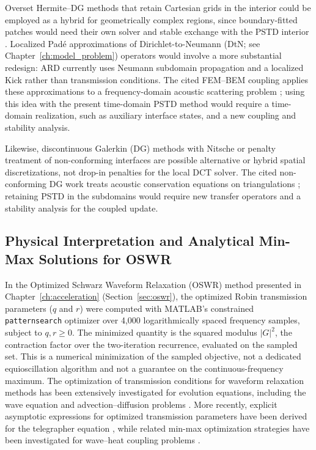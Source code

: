 \documentclass{Configuration_Files/PoliMi3i_thesis}
\newif\ifshowthesischanges
\DeclareRobustCommand{\thesischange}[2]{%
    \ifshowthesischanges
        \textcolor{#1}{#2}%
    \else
        #2%
    \fi
}
\def\thesischange#1#2{#2}%
\begin{document}
\thesischange{red}{Overset Hermite--DG methods that retain Cartesian grids in the interior could be employed as a hybrid for geometrically complex regions, since boundary-fitted patches would need their own solver and stable exchange with the PSTD interior \citep{beznosov_hermite_2021}. Localized Pad\'e approximations of Dirichlet-to-Neumann (DtN; see Chapter~\ref{ch:model_problem}) operators would involve a more substantial redesign: ARD currently uses Neumann subdomain propagation and a localized Kick rather than transmission conditions. The cited FEM--BEM coupling applies these approximations to a frequency-domain acoustic scattering problem \citep{caudron_optimized_2020}; using this idea with the present time-domain PSTD method would require a time-domain realization, such as auxiliary interface states, and a new coupling and stability analysis.}

\thesischange{red}{Likewise, discontinuous Galerkin (DG) methods with Nitsche or penalty treatment of non-conforming interfaces are possible alternative or hybrid spatial discretizations, not drop-in penalties for the local DCT solver. The cited non-conforming DG work treats acoustic conservation equations on triangulations \citep{heinz_nonconforming_dg_2023}; retaining PSTD in the subdomains would require new transfer operators and a stability analysis for the coupled update.}

\subsection{\thesischange{red}{Physical Interpretation and Analytical Min-Max Solutions for OSWR}}

\thesischange{red}{In the Optimized Schwarz Waveform Relaxation (OSWR) method presented in Chapter~\ref{ch:acceleration} (Section~\ref{sec:oswr}), the optimized Robin transmission parameters ($q$ and $r$) were computed with MATLAB's constrained \texttt{patternsearch} optimizer \citep{mathworks_patternsearch_docs} over 4,000 logarithmically spaced frequency samples, subject to $q,r\ge0$. The minimized quantity is the squared modulus $|G|^2$, the contraction factor over the two-iteration recurrence, evaluated on the sampled set. This is a numerical minimization of the sampled objective, not a dedicated equioscillation algorithm and not a guarantee on the continuous-frequency maximum. The optimization of transmission conditions for waveform relaxation methods has been extensively investigated for evolution equations, including the wave equation and advection--diffusion problems \citep{gander_optimal_2003,gander_absorbing_2004,gander_optimized_2007,martin_optimized_2005}. More recently, explicit asymptotic expressions for optimized transmission parameters have been derived for the telegrapher equation \citep{al-khaleel_optimized_2024}, while related min-max optimization strategies have been investigated for wave--heat coupling problems \citep{chouly_optimized_2025}.}
\end{document}
